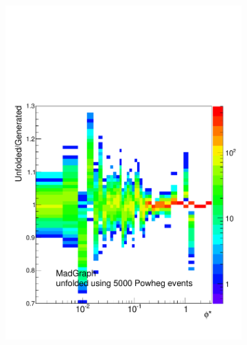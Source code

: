 \begin{figure}[!htbp]
\begin{subfigure}[b]{\SideBySidePlotWidth}
        \includegraphics[width=\textwidth]{figures/ToyMC_PM_5000.pdf}
        \caption{}
        \label{fig:toy_mc_5000}
    \end{subfigure}%
    \begin{subfigure}[b]{\SideBySidePlotWidth}

\end{subfigure}
\end{figure}
